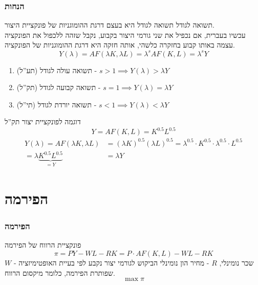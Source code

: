 \documentclass[usenames,dvipsnames]{beamer}
\begin{document}
\begin{RTL}
\begin{frame}
    \end{frame}

    \begin{frame}[allowframebreaks]
        \frametitle{הנחות}
        \begin{block}{תשואה לגודל}
            תשואה לגודל היא בעצם דרגת ההומוגניות של פונקציית היצור. \\ 
            עכשיו בעברית, אם נכפיל את שני גורמי היצור בקבוע, נקבל שזהה ללכפול את הפונקציה עצמה באותו קבוע בחזקרה כלשהי, אותה חזקה היא דרגת ההומוגניות של הפונקציה.
            $$Y(\lambda) = AF(\lambda K, \lambda L) = \lambda^{s} AF(K,L) = \lambda^s Y $$
        \end{block}

        \begin{enumerate}
            \item תשואה עולה לגודל (תע''ל) - $s>1 \implies Y(\lambda) > \lambda Y $ 
            \item תשואה קבועה לגודל (תק''ל) - $s = 1 \implies Y(\lambda) = \lambda Y $
            \item תשואה יורדת לגודל (תי''ל) - $s<1 \implies Y(\lambda) < \lambda Y $
        \end{enumerate}
        
        \framebreak

        \begin{exampleblock}{דוגמה לפונקציית יצור תק''ל} 
            $$Y = AF(K,L) = K^{0.5} L^{0.5}$$
        \begin{align*}
            Y(\lambda) = AF(\lambda K , \lambda L ) &= (\lambda K )^{0.5} (\lambda L ) ^{0.5} = \lambda^{0.5} \cdot K ^{0.5} \cdot  \lambda ^{0.5} \cdot L ^{0.5} \\ =\lambda \underbrace{K^{0.5} L^{0.5}}_{=Y} &= \lambda Y
        \end{align*}
            
        \end{exampleblock}
    
    \end{frame}

    \section{הפירמה }
    \begin{frame}
        \frametitle{הפירמה}
        \begin{block}{פונקציית הרווח של הפירמה}
            $$\pi = PY - WL - RK = P \cdot AF(K,L) - WL - RK $$
            $W$ - שכר נומינלי, $R$ - מחיר הון נומינלי
            הביקוש לגורמי יצור נקבע לפי בעיית האופטימיזציה שפותרת הפירמה, כלומר מיקסום הרווח.
            $$\max \pi$$


\end{block}
\end{frame}
\end{RTL}
\end{document}
